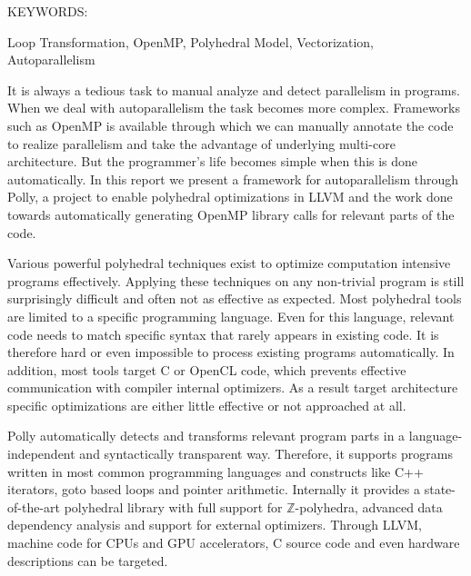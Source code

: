 \documentclass[MTech]{iitmdiss}
\begin{document}
\abstract

\noindent KEYWORDS: \hspace*{0.5em} \parbox[t]{4.4in}{Loop Transformation,
OpenMP, Polyhedral Model, Vectorization, Autoparallelism}

\vspace*{24pt}

It is always a tedious task to manual analyze and detect parallelism in programs. When
we deal with autoparallelism the task becomes more complex. Frameworks such as OpenMP
is available through which we can manually annotate the code to realize parallelism and take the
advantage of underlying multi-core architecture. But the programmer's life becomes simple
when this is done automatically. In this report we present a framework for autoparallelism through Polly,
a project to enable polyhedral optimizations in LLVM and the work done
towards automatically generating OpenMP library calls for relevant parts of the code.

Various powerful polyhedral techniques exist to optimize
computation intensive programs effectively.  Applying these techniques on any
non-trivial
program is still surprisingly difficult and often not as effective as expected.
Most polyhedral tools are limited to a specific programming language.  Even for
this language, relevant code needs to match specific syntax that rarely
appears in existing code.  It is therefore hard or even impossible to
process existing programs automatically.  In addition, most tools target C or
OpenCL code, which prevents effective communication with compiler internal
optimizers. As a result target architecture specific optimizations are
either little effective or not approached at all.

 Polly automatically detects and transforms relevant program parts in a
language-independent and syntactically transparent way. Therefore, it supports
programs written in most common programming languages and constructs
like C++ iterators, goto based loops and pointer arithmetic.  Internally it
provides a state-of-the-art polyhedral library with full support for
$\mathbb{Z}$-polyhedra, advanced data dependency analysis and
support for external optimizers. Through LLVM, machine code for CPUs and GPU accelerators,
C source code and even hardware descriptions can be targeted.


\pagebreak


\begin{singlespace}
\tableofcontents
\thispagestyle{empty}

\listoftables
{}
\listoffigures
{}
\end{singlespace}
\end{document}
